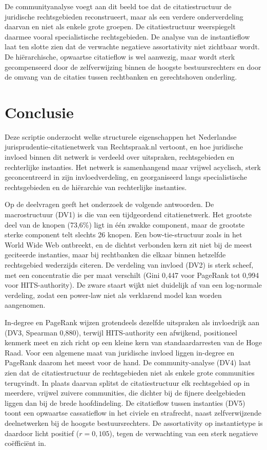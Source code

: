 \documentclass[a4paper, 12pt]{report}
\begin{document}
De communityanalyse voegt aan dit beeld toe dat de citatiestructuur de juridische rechtsgebieden reconstrueert, maar als een verdere onderverdeling daarvan en niet als enkele grote groepen. De citatiestructuur weerspiegelt daarmee vooral specialistische rechtsgebieden. De analyse van de instantieflow laat ten slotte zien dat de verwachte negatieve assortativity niet zichtbaar wordt. De hiërarchische, opwaartse citatieflow is wel aanwezig, maar wordt sterk gecompenseerd door de zelfverwijzing binnen de hoogste bestuursrechters en door de omvang van de citaties tussen rechtbanken en gerechtshoven onderling.

\chapter{Conclusie}
Deze scriptie onderzocht welke structurele eigenschappen het Nederlandse jurisprudentie-citatienetwerk van Rechtspraak.nl vertoont, en hoe juridische invloed binnen dit netwerk is verdeeld over uitspraken, rechtsgebieden en rechterlijke instanties. Het netwerk is samenhangend maar vrijwel acyclisch, sterk geconcentreerd in zijn invloedverdeling, en georganiseerd langs specialistische rechtsgebieden en de hiërarchie van rechterlijke instanties.
 
Op de deelvragen geeft het onderzoek de volgende antwoorden. De macrostructuur (DV1) is die van een tijdgeordend citatienetwerk. Het grootste deel van de knopen (73,6\%) ligt in één zwakke component, maar de grootste sterke component telt slechts 26 knopen. Een bow-tie-structuur zoals in het World Wide Web ontbreekt, en de dichtst verbonden kern zit niet bij de meest geciteerde instanties, maar bij rechtbanken die elkaar binnen hetzelfde rechtsgebied wederzijds citeren. De verdeling van invloed (DV2) is sterk scheef, met een concentratie die per maat verschilt (Gini 0,447 voor PageRank tot 0,994 voor HITS-authority). De zware staart wijkt niet duidelijk af van een log-normale verdeling, zodat een power-law niet als verklarend model kan worden aangenomen.
 
In-degree en PageRank wijzen grotendeels dezelfde uitspraken als invloedrijk aan (DV3, Spearman 0,880), terwijl HITS-authority een afwijkend, positioneel kenmerk meet en zich richt op een kleine kern van standaardarresten van de Hoge Raad. Voor een algemene maat van juridische invloed liggen in-degree en PageRank daarom het meest voor de hand. De community-analyse (DV4) laat zien dat de citatiestructuur de rechtsgebieden niet als enkele grote communities terugvindt. In plaats daarvan splitst de citatiestructuur elk rechtsgebied op in meerdere, vrijwel zuivere communities, die dichter bij de fijnere deelgebieden liggen dan bij de brede hoofdindeling. De citatieflow tussen instanties (DV5) toont een opwaartse cassatieflow in het civiele en strafrecht, naast zelfverwijzende deelnetwerken bij de hoogste bestuursrechters. De assortativity op instantietype is daardoor licht positief ($r = 0{,}105$), tegen de verwachting van een sterk negatieve coëfficiënt in.
 
\end{document}
